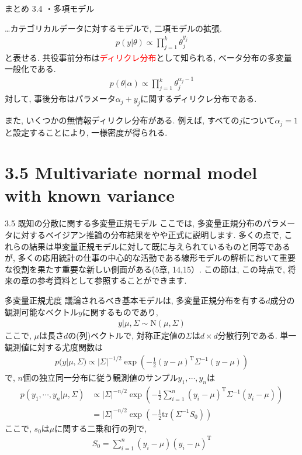 \documentclass[10pt,dvipdfmx,a4]{beamer}
\newcommand{\eq}[1]{\begin{align}#1\end{align}}
\newcommand{\eqn}[1]{\begin{align*}#1\end{align*}}
\newcommand{\tcr}[1]{\textcolor{red}{#1}}
\begin{document}
\begin{frame}{まとめ 3.4}
・多項モデル

…カテゴリカルデータに対するモデルで, 二項モデルの拡張.
\eqn{p(y|\theta)\propto\prod_{j=1}^k \theta_j^{y_j}}
と表せる.
共役事前分布は\tcr{ディリクレ分布}として知られる, ベータ分布の多変量一般化である.
\eqn{p(\theta|\alpha)\propto \prod_{j=1}^k\theta_j^{\alpha_j-1}}
対して, 事後分布はパラメータ$\alpha_j+y_j$に関するディリクレ分布である.

また, いくつかの無情報ディリクレ分布がある.
例えば, すべての$j$について$\alpha_j= 1$と設定することにより, 一様密度が得られる.
\end{frame}

\section{3.5 Multivariate normal model with known variance}
\begin{frame}{3.5 既知の分散に関する多変量正規モデル}
ここでは, 多変量正規分布のパラメータに対するベイジアン推論の分布結果をやや正式に説明します.
多くの点で, これらの結果は単変量正規モデルに対して既に与えられているものと同等であるが, 多くの応用統計の仕事の中心的な活動である線形モデルの解析において重要な役割を果たす重要な新しい側面がある(5章, 14,15）.
この節は, この時点で, 将来の章の参考資料として参照することができます.
\end{frame}


\begin{frame}{多変量正規尤度}
議論されるべき基本モデルは, 多変量正規分布を有する$d$成分の観測可能なベクトル$y$に関するものであり,
\eq{y|\mu, \Sigma\sim\text{N}(\mu,\Sigma)}
ここで, $\mu$は長さ$d$の(列)ベクトルで, 対称正定値の$\Sigma$は$d\times d$分散行列である.
単一観測値に対する尤度関数は
\eqn{p(y|\mu,\Sigma)\propto |\Sigma|^{-1/2}\exp \left(-\tfrac{1}{2}(y-\mu)^{\mathrm{T}}\Sigma^{-1}(y-\mu)\right)}
で, $n$個の独立同一分布に従う観測値のサンプル$y_1,\cdots,y_n$は
\eq{p(y_1,\cdots,y_n|\mu,\Sigma)&\propto|\Sigma|^{-n/2} \exp\left(-\tfrac{1}{2}\sum_{i=1}^n(y_i-\mu)^{\mathrm{T}}\Sigma^{-1}(y_i-\mu)\right)\nonumber\\
&=|\Sigma|^{-n/2}\exp \left(-\tfrac{1}{2}\text{tr}(\Sigma^{-1}S_0)\right)}
ここで, $s_0$は$\mu$に関する二乗和行の列で,
\eq{S_0=\sum_{i=1}^n(y_i-\mu)(y_i-\mu)^{\mathrm{T}}}
\end{frame}
\end{document}
